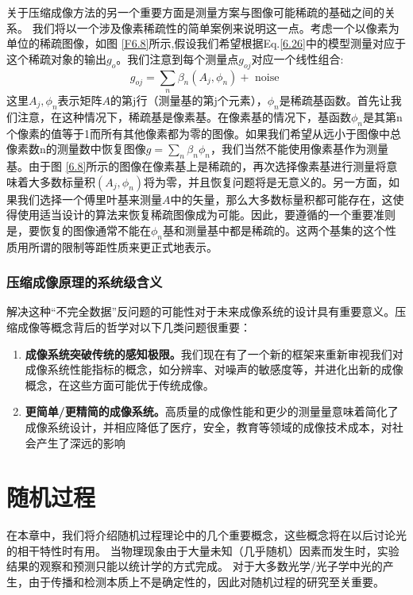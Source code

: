 \documentclass[12pt, UTF8]{ctexart}%
\numberwithin{equation}{section}
\numberwithin{figure}{section}
\newcommand{\InsertEqution}[2]{\begin{equation}
  \label{#1}
   #2
 \end{equation}}
\newcommand{\RefEq}[1]{Eq.\ref{#1}}
\newcommand{\InsertInlineEq}[1]{$#1$}
\newcommand{\RefFig}[1]{图 \ref{#1}}
\newcommand{\InsertItem}[1]{\begin{enumerate} #1 \end{enumerate}}
\begin{document}
\begin{sloppypar}
关于压缩成像方法的另一个重要方面是测量方案与图像可能稀疏的基础之间的关系。 我们将以一个涉及像素稀疏性的简单案例来说明这一点。考虑一个以像素为单位的稀疏图像，如\RefFig{F6.8}所示,假设我们希望根据\RefEq{6.26}中的模型测量对应于这个稀疏对象的输出\InsertInlineEq{g_o}。我们注意到每个测量点\InsertInlineEq{g_{oj}}对应一个线性组合:
\InsertEqution{6.28}{g_{o j}=\sum_{n} \beta_{n}\left(A_{j}, \phi_{n}\right)+\text { noise }}
这里\InsertInlineEq{A_j,\phi_n}表示矩阵\InsertInlineEq{A}的第j行（测量基的第j个元素），\InsertInlineEq{\phi_n}是稀疏基函数。首先让我们注意，在这种情况下，稀疏基是像素基。在像素基的情况下，基函数\InsertInlineEq{\phi_n}是其第n个像素的值等于1而所有其他像素都为零的图像。如果我们希望从远小于图像中总像素数n的测量数中恢复图像\InsertInlineEq{g=\sum_n\beta_n\phi_n}，我们当然不能使用像素基作为测量基。由于\RefFig{6.8}所示的图像在像素基上是稀疏的，再次选择像素基进行测量将意味着大多数标量积\InsertInlineEq{(A_j,\phi_n)}将为零，并且恢复问题将是无意义的。另一方面，如果我们选择一个傅里叶基来测量\InsertInlineEq{A}中的矢量，那么大多数标量积都可能存在，这使得使用适当设计的算法来恢复稀疏图像成为可能。因此，要遵循的一个重要准则是，要恢复的图像通常不能在\InsertInlineEq{\phi_n}基和测量基中都是稀疏的。这两个基集的这个性质用所谓的限制等距性质来更正式地表示。
\subsubsection{压缩成像原理的系统级含义}
解决这种“不完全数据”反问题的可能性对于未来成像系统的设计具有重要意义。压缩成像等概念背后的哲学对以下几类问题很重要：
\InsertItem{\item \textbf{成像系统突破传统的感知极限。}我们现在有了一个新的框架来重新审视我们对成像系统性能指标的概念，如分辨率、对噪声的敏感度等，并进化出新的成像概念，在这些方面可能优于传统成像。
\item \textbf{更简单/更精简的成像系统。}高质量的成像性能和更少的测量量意味着简化了成像系统设计，并相应降低了医疗，安全，教育等领域的成像技术成本，对社会产生了深远的影响}

\section{随机过程}
在本章中，我们将介绍随机过程理论中的几个重要概念，这些概念将在以后讨论光的相干特性时有用。 当物理现象由于大量未知（几乎随机）因素而发生时，实验结果的观察和预测只能以统计学的方式完成。 对于大多数光学/光子学中光的产生，由于传播和检测本质上不是确定性的，因此对随机过程的研究至关重要。

  \end{sloppypar}
\end{document}
